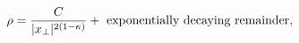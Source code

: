 \begin{equation}
\rho=\frac{C}{|x_\perp|^{2(1-\kappa)}}+\hbox{
exponentially decaying remainder},
\end{equation}

